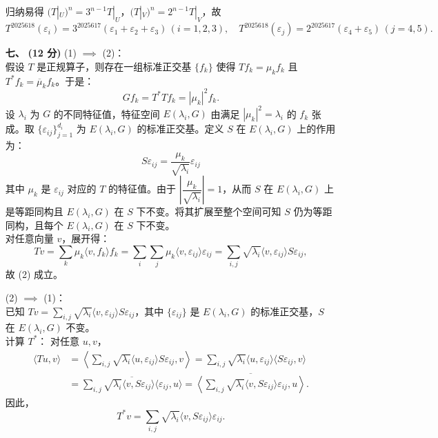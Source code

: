 \documentclass{ctexart}
\begin{document}
\begin{enumerate}
    归纳易得 \((T|_U)^n = 3^{n-1}T|_U\)，\((T|_V)^n = 2^{n-1}T|_V\)，故  
    \[
    T^{2025618}(\varepsilon_i) = 3^{2025617}(\varepsilon_1+\varepsilon_2+\varepsilon_3) \, (i=1,2,3), \quad T^{2025618}(\varepsilon_j) = 2^{2025617}(\varepsilon_4+\varepsilon_5) \, (j=4,5).
    \]
    \item[\textbf{七、}] \textbf{(12 分)} 
    (1) \(\implies\) (2)：\\
    假设 \(T\) 是正规算子，则存在一组标准正交基 \(\{f_k\}\) 使得 \(T f_k = \mu_k f_k\) 且 \(T^* f_k = \overline{\mu}_k f_k\)。于是： \[G f_k = T^* T f_k = |\mu_k|^2 f_k.\]
    设 \(\lambda_i\) 为 \(G\) 的不同特征值，特征空间 \(E(\lambda_i, G)\) 由满足 \(|\mu_k|^2 = \lambda_i\) 的 \(f_k\) 张成。取 \(\{\varepsilon_{ij}\}_{j=1}^{d_i}\) 为 \(E(\lambda_i, G)\) 的标准正交基。定义 \(S\) 在 \(E(\lambda_i, G)\) 上的作用为：
    \[S \varepsilon_{ij} = \frac{\mu_k}{\sqrt{\lambda_i}} \varepsilon_{ij}\]
    其中 \(\mu_k\) 是 \(\varepsilon_{ij}\) 对应的 \(T\) 的特征值。由于 \(\left|\dfrac{\mu_k}{\sqrt{\lambda_i}}\right| = 1\)，从而 \(S\) 在 \(E(\lambda_i, G)\) 上是等距同构且 \(E(\lambda_i, G)\) 在 \(S\) 下不变。将其扩展至整个空间可知 \(S\) 仍为等距同构，且每个 \(E(\lambda_i, G)\) 在 \(S\) 下不变。\\
    对任意向量 \(v\)，展开得：
    \[
    T v = \sum_k \mu_k \langle v, f_k \rangle f_k = \sum_i \sum_{j} \mu_k \langle v, \varepsilon_{ij} \rangle \varepsilon_{ij} = \sum_{i,j} \sqrt{\lambda_i} \langle v, \varepsilon_{ij} \rangle S \varepsilon_{ij},
    \]
    故 (2) 成立。

    (2) \(\implies\) (1)：\\
    已知 \(T v = \displaystyle\sum_{i,j} \sqrt{\lambda_i} \langle v, \varepsilon_{ij} \rangle S \varepsilon_{ij}\)，其中 \(\{\varepsilon_{ij}\}\) 是 \(E(\lambda_i, G)\) 的标准正交基，\(S\) 在 \(E(\lambda_i, G)\) 不变。 \\
    计算 \(T^*\)：
    对任意 \(u, v\)，
    \begin{align*}
        \langle T u, v \rangle 
        &= \left\langle \sum_{i,j} \sqrt{\lambda_i} \langle u, \varepsilon_{ij} \rangle S \varepsilon_{ij}, v \right\rangle = \sum_{i,j} \sqrt{\lambda_i} \langle u, \varepsilon_{ij} \rangle \langle S \varepsilon_{ij}, v \rangle \\
        &= \overline{ \sum_{i,j} \sqrt{\lambda_i} \langle v, S\varepsilon_{ij} \rangle \langle \varepsilon_{ij}, u \rangle} = \overline{\left\langle \sum_{i,j} \sqrt{\lambda_i} \langle v, S \varepsilon_{ij} \rangle \varepsilon_{ij}, u \right\rangle}.
    \end{align*}
    因此，
    \[T^* v = \sum_{i,j} \sqrt{\lambda_i} \langle v, S \varepsilon_{ij} \rangle \varepsilon_{ij}.\]


\end{enumerate}
\end{document}
